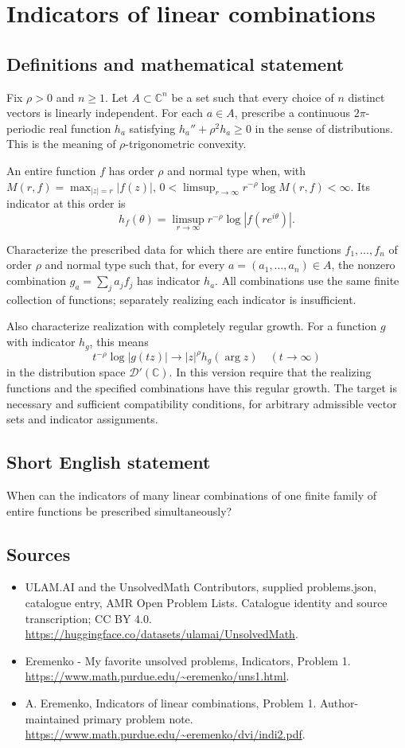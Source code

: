 \documentclass[11pt,a4paper]{article}
\begin{document}
\section*{Indicators of linear combinations}\label{statement}

\subsection{Definitions and mathematical statement}
Fix $\rho>0$ and $n\geq1$. Let $A\subset\mathbb C^n$ be
a set such that every choice of $n$ distinct vectors is
linearly independent. For each $a\in A$, prescribe a
continuous $2\pi$-periodic real function $h_a$ satisfying
$h_a''+\rho^2h_a\geq0$ in the sense of distributions.
This is the meaning of $\rho$-trigonometric convexity.

An entire function $f$ has order $\rho$ and normal type
when, with $M(r,f)=\max_{|z|=r}|f(z)|$,
$0<\limsup_{r\to\infty}r^{-\rho}\log M(r,f)<\infty$.
Its indicator at this order is
\[
 h_f(\theta)=\limsup_{r\to\infty}
                 r^{-\rho}\log|f(re^{i\theta})|.
\]

Characterize the prescribed data for which there are entire
functions $f_1,\ldots,f_n$ of order $\rho$ and normal type
such that, for every $a=(a_1,\ldots,a_n)\in A$, the
nonzero combination $g_a=\sum_ja_jf_j$ has indicator $h_a$.
All combinations use the same finite collection of functions;
separately realizing each indicator is insufficient.

Also characterize realization with completely regular growth.
For a function $g$ with indicator $h_g$, this means
\[
 t^{-\rho}\log|g(tz)|\longrightarrow
             |z|^\rho h_g(\arg z)\quad(t\to\infty)
\]
in the distribution space $\mathcal D'(\mathbb C)$.
In this version require that the realizing functions and
the specified combinations have this regular growth.
The target is necessary and sufficient compatibility
conditions, for arbitrary admissible vector sets and
indicator assignments.
\subsection{Short English statement}
When can the indicators of many linear combinations of one finite family of entire functions be prescribed simultaneously?
\subsection{Sources}
\begin{itemize}
\item[S1] ULAM.AI and the UnsolvedMath Contributors, supplied problems.json, catalogue entry, AMR Open Problem Lists. Catalogue identity and source transcription; CC BY 4.0.
\url{https://huggingface.co/datasets/ulamai/UnsolvedMath}.
\item[S2] Eremenko - My favorite unsolved problems, Indicators, Problem 1. 
\url{https://www.math.purdue.edu/~eremenko/uns1.html}.
\item[S3] A. Eremenko, Indicators of linear combinations, Problem 1. Author-maintained primary problem note.
\url{https://www.math.purdue.edu/~eremenko/dvi/indi2.pdf}.
\end{itemize}
\end{document}
